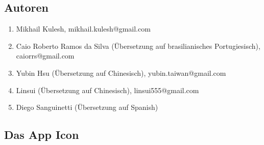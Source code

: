 \documentclass[DIV=calc, paper=a4, fontsize=11pt, twocolumn]{scrartcl}
\begin{document}
\subsection{Autoren}

\begin{enumerate}
\item Mikhail Kulesh,
mikhail.kulesh@gmail.com

\item Caio Roberto Ramos da Silva
(Übersetzung auf brasilianisches
Portugiesisch),
caiorrs@gmail.com

\item Yubin Hsu
(Übersetzung auf Chinesisch),
yubin.taiwan@gmail.com

\item Linsui
(Übersetzung auf Chinesisch),
linsui555@gmail.com

\item Diego Sanguinetti
(Übersetzung auf Spanish)
\end{enumerate}

\subsection{Das App Icon}
\end{document}
